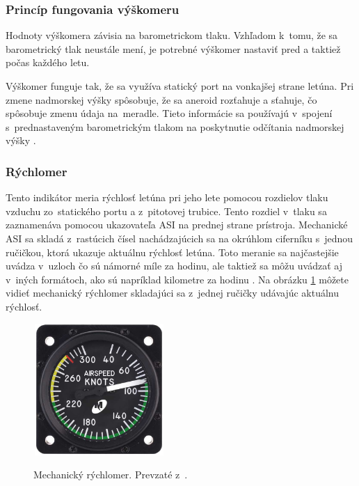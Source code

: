 \subsubsection{Princíp fungovania výškomeru}
Hodnoty výškomera závisia na barometrickom tlaku. Vzhľadom k~tomu, že sa barometrický tlak neustále mení, je potrebné výškomer nastaviť pred a taktiež počas každého letu.

Výškomer funguje tak, že sa využíva statický port na vonkajšej strane letúna. Pri zmene nadmorskej výšky spôsobuje, že sa aneroid rozťahuje a sťahuje, čo spôsobuje zmenu údaja na~meradle. Tieto informácie sa používajú v~spojení s~prednastaveným barometrickým tlakom na poskytnutie odčítania nadmorskej výšky \cite{Instruments}.

\bigskip
\subsubsection{Rýchlomer}
Tento indikátor meria rýchlosť letúna pri jeho lete pomocou rozdielov tlaku vzduchu zo~statického portu a z~pitotovej trubice. Tento rozdiel v~tlaku sa zaznamenáva pomocou ukazovateľa ASI na prednej strane prístroja. Mechanické ASI sa skladá z~rastúcich čísel nachádzajúcich sa na okrúhlom ciferníku s~jednou ručičkou, ktorá ukazuje aktuálnu rýchlosť letúna. Toto meranie sa najčastejšie uvádza v~uzloch čo sú námorné míle za hodinu, ale taktiež sa môžu uvádzať aj v~iných formátoch, ako sú napríklad kilometre za hodinu \cite{Instruments}. Na obrázku \ref{ASI} môžete vidieť mechanický rýchlomer skladajúci sa z~jednej ručičky udávajúc aktuálnu rýchlosť.
\begin{figure}[ht]
\centering
\includegraphics[height=5cm, width=5cm]{obrazky-figures/rychlomer.png}
\caption{Mechanický rýchlomer. Prevzaté z~\cite{fotoIndikator}.}{\label{ASI}}
\end{figure}

